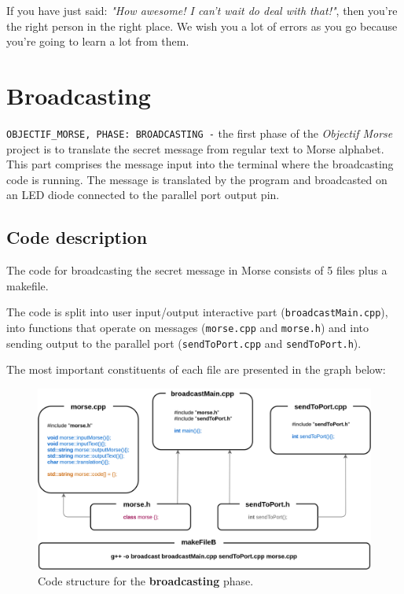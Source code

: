 \documentclass[10pt]{report}
\begin{document}
If you have just said: \textit{"How awesome! I can't wait do deal with that!"}, then you're the right person in the right place. We wish you a lot of errors as you go because you're going to learn a lot from them. 

\newpage

\chapter{Broadcasting}


\verb|OBJECTIF_MORSE, PHASE: BROADCASTING -| the first phase of the \textit{Objectif Morse} project is to translate the secret message from regular text to Morse alphabet. This part comprises the message input into the terminal where the broadcasting code is running. The message is translated by the program and broadcasted on an LED diode connected to the parallel port output pin.



\section{Code description}

The code for broadcasting the secret message in Morse consists of 5 files plus a makefile.

The code is split into user input/output interactive part (\verb|broadcastMain.cpp|), into functions that operate on messages (\verb|morse.cpp| and \verb|morse.h|) and into sending output to the parallel port (\verb|sendToPort.cpp| and \verb|sendToPort.h|).

The most important constituents of each file are presented in the graph below:

\begin{figure}[H]
\centering\includegraphics[width=14.5cm]{bCodeStructure}
\caption{Code structure for the \textbf{broadcasting} phase.}				
\label{fig:br_code}
\end{figure}
\end{document}
